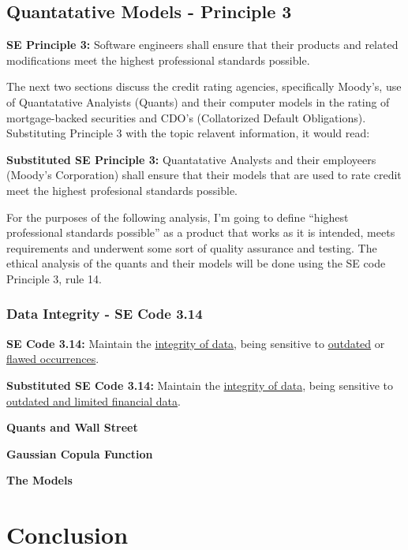 \documentclass[11pt]{article}
\begin{document}
\begin{multicols}{2}
 
\subsection{Quantatative Models - Principle 3}

\begin{framed}
\noindent
\textbf{SE Principle 3:  }
\newline
Software engineers shall ensure that their products and related modifications meet the highest professional standards possible.
\end{framed}


The next two sections discuss the credit rating agencies, specifically Moody's, use of Quantatative Analyists (Quants) and their computer models in the rating of mortgage-backed securities and CDO's (Collatorized Default Obligations).  Substituting Principle 3 with the topic relavent information, it would read:

\begin{framed}
\noindent
{\bf Substituted SE Principle 3:}
\newline
Quantatative Analysts and their employeers (Moody's Corporation) shall ensure that their models that are used to rate credit meet the highest profesional standards possible.
\end{framed}

For the purposes of the following analysis, I'm going to define ``highest professional standards possible'' as a product that works as it is intended, meets requirements and underwent some sort of quality assurance and testing.  The ethical analysis of the quants and their models will be done using the SE code Principle 3, rule 14.

\subsubsection{Data Integrity - SE Code 3.14}

\begin{framed}
\noindent
   \textbf{SE Code 3.14: } 
   \newline
   Maintain the \underline{integrity of data}, being sensitive to \underline{outdated} or \underline{flawed occurrences}.
\end{framed}


\begin{framed}
\noindent
   \textbf{Substituted SE Code 3.14: } 
   \newline
   Maintain the \underline{integrity of data}, being sensitive to \underline{outdated and limited financial data}.
\end{framed}

\textbf{Quants and Wall Street}

\textbf{Gaussian Copula Function}

\textbf{The Models}


\section{Conclusion}

\end{multicols}
\newpage


\nocite{*}




\end{document}

